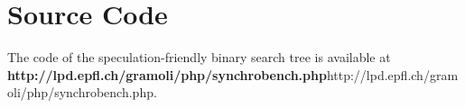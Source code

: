 \section*{Source Code}
The code of the speculation-friendly binary search tree is available at {\bf http://lpd.epfl.ch/gramoli/php/synchrobench.php}{http://lpd.epfl.ch/gramoli/php/synchrobench.php}.

% 
% 
% 
% 
% 

